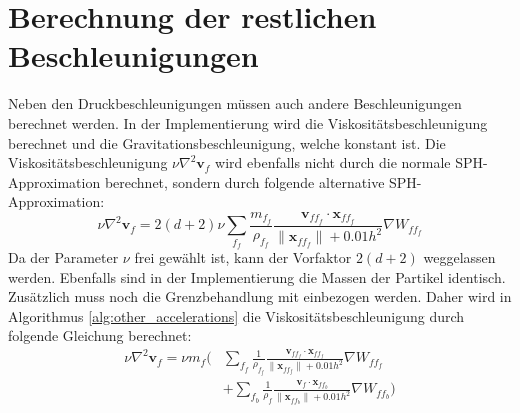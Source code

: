 \documentclass[11pt,
a4paper,
parskip=half, %
BCOR=10mm, %
english,
ngerman]{scrreprt}
\begin{document}
\section{Berechnung der restlichen Beschleunigungen}
Neben den Druckbeschleunigungen müssen auch andere Beschleunigungen berechnet werden.
In der Implementierung wird die Viskositätsbeschleunigung berechnet und die Gravitationsbeschleunigung, welche konstant ist.
Die Viskositätsbeschleunigung $\nu \nabla^2 \textbf{v}_f$ wird ebenfalls nicht durch die normale SPH-Approximation berechnet,
sondern durch folgende alternative SPH-Approximation:
\begin{equation}
    \nu \nabla^2 \textbf{v}_f = 2(d + 2) \nu \sum_{f_f} \frac{m_{f_f}}{\rho_{f_f}} \frac{\textbf{v}_{ff_f} \cdot \textbf{x}_{ff_f}}{\|\textbf{x}_{ff_f}\| + 
    0.01h^2} \nabla W_{ff_f}
\end{equation}
Da der Parameter $\nu$ frei gewählt ist, kann der Vorfaktor $2(d+2)$ weggelassen werden.
Ebenfalls sind in der Implementierung die Massen der Partikel identisch.
Zusätzlich muss noch die Grenzbehandlung mit einbezogen werden.
Daher wird in Algorithmus \ref{alg:other_accelerations} die Viskositätsbeschleunigung
durch folgende Gleichung berechnet:
\begin{align}
    \nu \nabla^2 \textbf{v}_f = \nu m_f \biggl(&\sum_{f_f} \frac{1}{\rho_{f_f}} \frac{\textbf{v}_{ff_f} \cdot \textbf{x}_{ff_f}}{\|\textbf{x}_{ff_f}\| + 
    0.01h^2} \nabla W_{ff_f}\\
    &+ \sum_{f_b} \frac{1}{\rho_f} \frac{\textbf{v}_f \cdot \textbf{x}_{ff_b}}{\|\textbf{x}_{ff_b}\| + 
    0.01h^2} \nabla W_{ff_b}
    \biggr)
\end{align}
\end{document}
